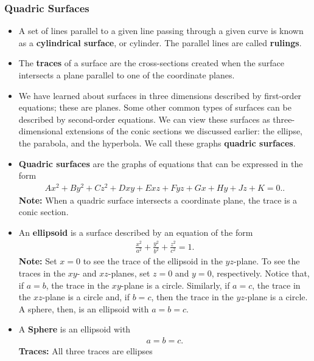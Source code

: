 \documentclass{report}
\begin{document}
    \subsubsection{Quadric Surfaces}
    \begin{itemize}
    \item A set of lines parallel to a given line passing through a given curve is known as a \textbf{cylindrical surface}, or cylinder. The parallel lines are called \textbf{rulings}.
    \item The \textbf{traces} of a surface are the cross-sections created when the surface intersects a plane parallel to one of the coordinate planes.
    \item We have learned about surfaces in three dimensions described by first-order equations; these are planes. Some other common types of surfaces can be described by second-order equations. We can view these surfaces as three-dimensional extensions of the conic sections we discussed earlier: the ellipse, the parabola, and the hyperbola. We call these graphs \textbf{quadric surfaces}.
    \item \textbf{Quadric surfaces} are the graphs of equations that can be expressed in the form
        \begin{align*}
            Ax^2 + By^2 + Cz^2 + Dxy + Exz + Fyz + Gx + Hy + Jz + K = 0.
        .\end{align*}
        \textbf{Note:} When a quadric surface intersects a coordinate plane, the trace is a conic section.
    \item An \textbf{ellipsoid} is a surface described by an equation of the form
        \begin{align*}
            \frac{x^{2}}{a^{2}} + \frac{y^{2}}{b^{2}} + \frac{z^{2}}{c^{2}} = 1
        .\end{align*}
        \textbf{Note:} Set $x=0$ to see the trace of the ellipsoid in the $yz$-plane. To see the traces in the $xy$- and $xz$-planes, set $z=0$ and $y=0$, respectively. Notice that, if $a=b$, the trace in the $xy$-plane is a circle. Similarly, if $a=c$, the trace in the $xz$-plane is a circle and, if $b=c$, then the trace in the $yz$-plane is a circle. A sphere, then, is an ellipsoid with $a=b=c$.
        \bigbreak \noindent 
    \item A \textbf{Sphere} is an ellipsoid with
        \begin{align*}
            a=b=c
        .\end{align*}
        \textbf{Traces:} All three traces are ellipses

\end{itemize}
\end{document}
